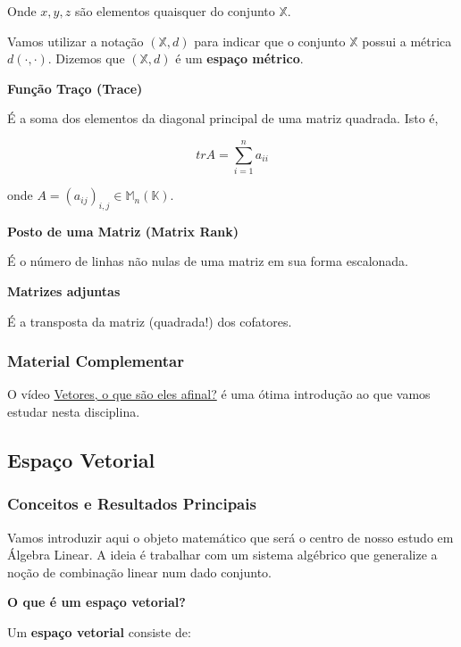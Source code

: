 \documentclass[
]{article}
\begin{document}
Onde \(x,y,z\) são elementos quaisquer do conjunto \(\mathbb{X}\).

Vamos utilizar a notação \((\mathbb{X},d)\) para indicar que o conjunto
\(\mathbb{X}\) possui a métrica \(d(\cdot , \cdot)\). Dizemos que
\((\mathbb{X},d)\) é um \textbf{espaço métrico}.

\textbf{Função Traço (Trace)}

É a soma dos elementos da diagonal principal de uma matriz quadrada.
Isto é,

\[tr A = \sum_{i=1}^n {a_{ii}}\]

onde \(A = (a_{ij})_{i,j} \in \mathbb{M}_n(\mathbb{K})\).

\textbf{Posto de uma Matriz (Matrix Rank)}

É o número de linhas não nulas de uma matriz em sua forma escalonada.

\textbf{Matrizes adjuntas}

É a transposta da matriz (quadrada!) dos cofatores.

\hypertarget{material-complementar-1}{%
\subsubsection{Material Complementar}\label{material-complementar-1}}

O vídeo
\href{https://www.youtube.com/watch?v=fNk_zzaMoSs\&list=PLZHQObOWTQDPD3MizzM2xVFitgF8hE_ab\&index=1}{Vetores,
o que são eles afinal?} é uma ótima introdução ao que vamos estudar
nesta disciplina.

\hypertarget{espauxe7o-vetorial}{%
\subsection{Espaço Vetorial}\label{espauxe7o-vetorial}}

\hypertarget{conceitos-e-resultados-principais-2}{%
\subsubsection{Conceitos e Resultados
Principais}\label{conceitos-e-resultados-principais-2}}

Vamos introduzir aqui o objeto matemático que será o centro de nosso
estudo em Álgebra Linear. A ideia é trabalhar com um sistema algébrico
que generalize a noção de combinação linear num dado conjunto.

\textbf{O que é um espaço vetorial?}

Um \textbf{espaço vetorial} consiste de:
\end{document}
